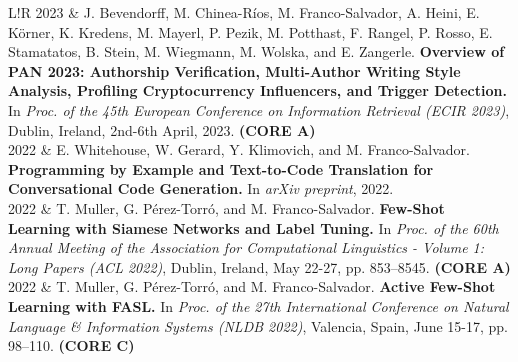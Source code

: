 \documentclass[10pt]{article}
\begin{document}
\begin{tabular}{L!{\VRule}R}
    2023 & J. Bevendorff, M. Chinea-Ríos, M. Franco-Salvador, A. Heini, E. Körner, K. Kredens, M. Mayerl, P. Pezik, M. Potthast, F. Rangel, P. Rosso, E. Stamatatos, B. Stein, M. Wiegmann, M. Wolska, and E. Zangerle. \textbf{Overview of PAN 2023: Authorship Verification, Multi-Author Writing Style Analysis, Profiling Cryptocurrency Influencers, and Trigger Detection.} In \emph{Proc. of the 45th European Conference on Information Retrieval (ECIR 2023)}, Dublin, Ireland, 2nd-6th April, 2023. \textbf{(CORE A)} \vspace{5pt}\\
	2022 & E. Whitehouse, W. Gerard, Y. Klimovich, and M. Franco-Salvador. \textbf{Programming by Example and Text-to-Code Translation for Conversational Code Generation.} In \emph{arXiv preprint}, 2022. \vspace{5pt}\\
	2022 & T. Muller, G. P{\'e}rez-Torr{\'o}, and M. Franco-Salvador. \textbf{Few-Shot Learning with Siamese Networks and Label Tuning.} In \emph{Proc. of the 60th Annual Meeting of the Association for Computational Linguistics - Volume 1: Long Papers (ACL 2022)}, Dublin, Ireland, May 22-27, pp. 853--8545. \textbf{(CORE A)} \vspace{5pt}\\
    2022 & T. Muller, G. P{\'e}rez-Torr{\'o}, and M. Franco-Salvador. \textbf{Active Few-Shot Learning with FASL.}
	In \emph{Proc. of the 27th International Conference on Natural Language \& Information Systems (NLDB 2022)}, Valencia, Spain, June 15-17, pp.  98--110. \textbf{(CORE C)} \vspace{5pt}\\
\end{tabular}
\end{document}
